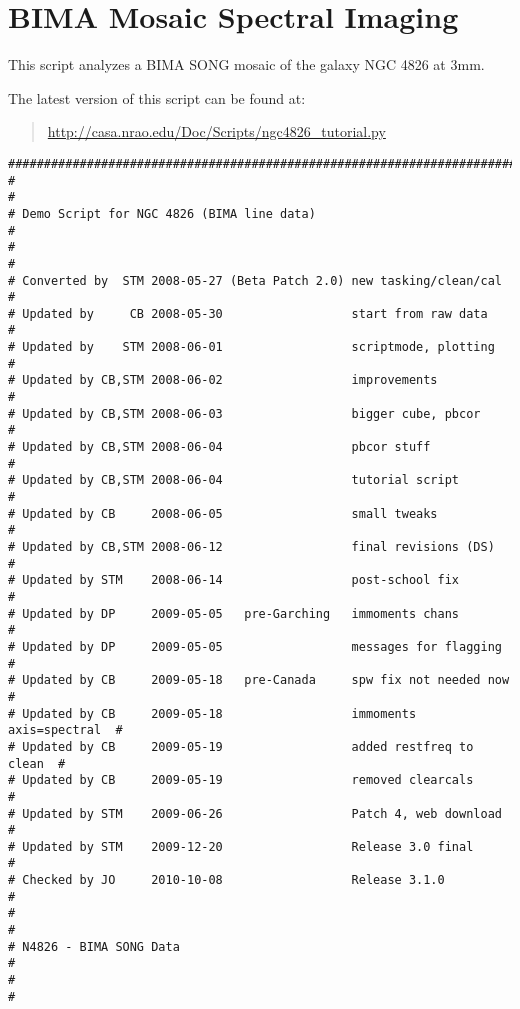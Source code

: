 \section{BIMA Mosaic Spectral Imaging}
\label{section:scripts.ngc4826}

This script analyzes a BIMA SONG mosaic of the galaxy NGC 4826
at 3mm.

The latest version of this script can be found at:
\begin{quote}
   \url{http://casa.nrao.edu/Doc/Scripts/ngc4826_tutorial.py}
\end{quote}

\small
\begin{verbatim}
##########################################################################
#                                                                        #
# Demo Script for NGC 4826 (BIMA line data)                              #
#                                                                        #
# Converted by  STM 2008-05-27 (Beta Patch 2.0) new tasking/clean/cal    #
# Updated by     CB 2008-05-30                  start from raw data      #
# Updated by    STM 2008-06-01                  scriptmode, plotting     #
# Updated by CB,STM 2008-06-02                  improvements             #
# Updated by CB,STM 2008-06-03                  bigger cube, pbcor       #
# Updated by CB,STM 2008-06-04                  pbcor stuff              #
# Updated by CB,STM 2008-06-04                  tutorial script          #
# Updated by CB     2008-06-05                  small tweaks             #
# Updated by CB,STM 2008-06-12                  final revisions (DS)     #
# Updated by STM    2008-06-14                  post-school fix          #
# Updated by DP     2009-05-05   pre-Garching   immoments chans          #
# Updated by DP     2009-05-05                  messages for flagging    #
# Updated by CB     2009-05-18   pre-Canada     spw fix not needed now   #
# Updated by CB     2009-05-18                  immoments axis=spectral  #
# Updated by CB     2009-05-19                  added restfreq to clean  #
# Updated by CB     2009-05-19                  removed clearcals        #
# Updated by STM    2009-06-26                  Patch 4, web download    #
# Updated by STM    2009-12-20                  Release 3.0 final        #
# Checked by JO     2010-10-08                  Release 3.1.0            #
#                                                                        #
# N4826 - BIMA SONG Data                                                 #
#                                                                        #

\end{verbatim}

